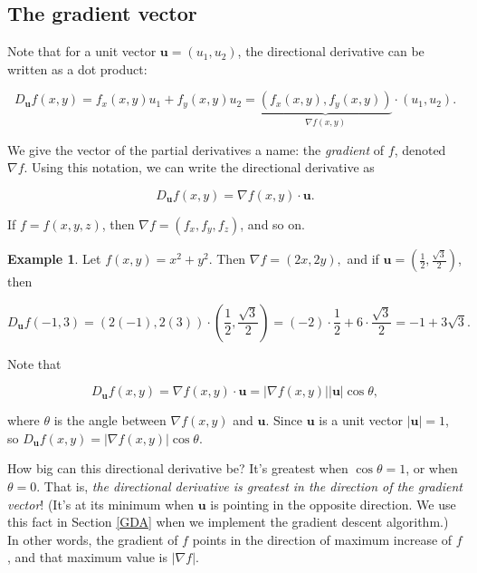 \documentclass[
]{book}
\theoremstyle{definition}
\theoremstyle{definition}
\newtheorem{example}{Example}[chapter]
\theoremstyle{definition}
\theoremstyle{definition}
\theoremstyle{remark}
\begin{document}
\subsection*{The gradient vector}\label{the-gradient-vector}

Note that for a unit vector \(\mathbf{u}=(u_1,u_2)\), the directional derivative can be written as a dot product:

\[D_{\mathbf{u}}f(x,y)=f_x(x,y)u_1+f_y(x,y)u_2=\underbrace{(f_x(x,y),f_y(x,y))}_{\nabla f(x,y)}\cdot (u_1,u_2).\]

We give the vector of the partial derivatives a name: the \emph{gradient} of \(f\), denoted \(\nabla f\). Using this notation, we can write the directional derivative as

\[D_{\mathbf{u}}f(x,y)=\nabla f(x,y)\cdot \mathbf{u}.\]

If \(f=f(x,y,z)\), then \(\nabla f=(f_x,f_y,f_z)\), and so on.

\begin{examplebox}

\begin{example}
Let \(f(x,y)=x^2+y^2\). Then \(\nabla f=(2x,2y),\)
and if \(\mathbf{u}=(\frac{1}{2},\frac{\sqrt{3}}{2})\), then

\[D_{\mathbf{u}}f(-1,3)=(2(-1),2(3))\cdot(\frac{1}{2},\frac{\sqrt{3}}{2})=(-2)\cdot\frac{1}{2}+6\cdot \frac{\sqrt{3}}{2}=-1+3\sqrt{3}.\]
\end{example}

\end{examplebox}

Note that

\[D_{\mathbf{u}}f(x,y)=\nabla f(x,y)\cdot \mathbf{u}=|\nabla f(x,y)||\mathbf{u}|\cos \theta,\]

where \(\theta\) is the angle between \(\nabla f(x,y)\) and \(\mathbf{u}.\) Since \(\mathbf{u}\) is a unit vector \(|\mathbf{u}|=1\), so \(D_{\mathbf{u}}f(x,y)=|\nabla f(x,y)|\cos \theta.\)

How big can this directional derivative be? It's greatest when \(\cos \theta=1\), or when \(\theta=0\). That is, \emph{the directional derivative is greatest in the direction of the gradient vector}! (It's at its minimum when \(\mathbf{u}\) is pointing in the opposite direction. We use this fact in Section \ref{GDA} when we implement the gradient descent algorithm.) In other words, the gradient of \(f\) points in the direction of maximum increase of \(f\), and that maximum value is \(|\nabla f|\).
\end{document}
